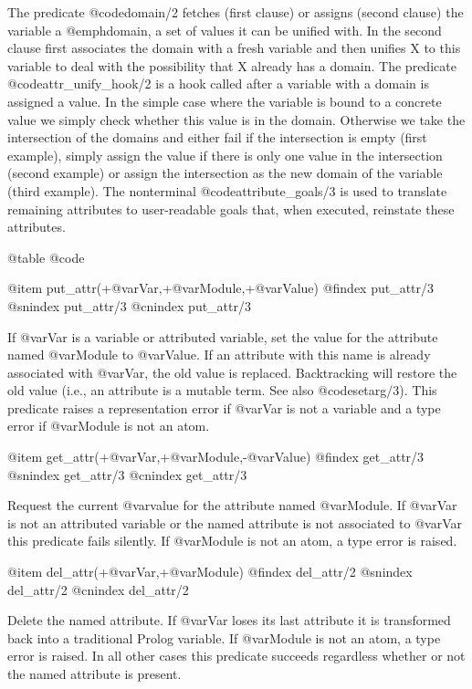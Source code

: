 The predicate @code{domain/2} fetches (first clause) or assigns
(second clause) the variable a @emph{domain}, a set of values it can
be unified with.  In the second clause first associates the domain
with a fresh variable and then unifies X to this variable to deal
with the possibility that X already has a domain. The
predicate @code{attr_unify_hook/2} is a hook called after a variable with
a domain is assigned a value.  In the simple case where the variable
is bound to a concrete value we simply check whether this value is in
the domain. Otherwise we take the intersection of the domains and either
fail if the intersection is empty (first example), simply assign the
value if there is only one value in the intersection (second example) or
assign the intersection as the new domain of the variable (third
example). The nonterminal @code{attribute_goals/3} is used to translate
remaining attributes to user-readable goals that, when executed, reinstate
these attributes.

@table @code

@item put_attr(+@var{Var},+@var{Module},+@var{Value})
@findex put_attr/3
@snindex put_attr/3
@cnindex put_attr/3

If @var{Var} is a variable or attributed variable, set the value for the
attribute named @var{Module} to @var{Value}. If an attribute with this
name is already associated with @var{Var}, the old value is replaced.
Backtracking will restore the old value (i.e., an attribute is a mutable
term. See also @code{setarg/3}). This predicate raises a representation error if
@var{Var} is not a variable and a type error if @var{Module} is not an atom.

@item get_attr(+@var{Var},+@var{Module},-@var{Value})
@findex get_attr/3
@snindex get_attr/3
@cnindex get_attr/3

Request the current @var{value} for the attribute named @var{Module}.  If
@var{Var} is not an attributed variable or the named attribute is not
associated to @var{Var} this predicate fails silently.  If @var{Module}
is not an atom, a type error is raised.

@item del_attr(+@var{Var},+@var{Module})
@findex del_attr/2
@snindex del_attr/2
@cnindex del_attr/2

Delete the named attribute.  If @var{Var} loses its last attribute it
is transformed back into a traditional Prolog variable.  If @var{Module}
is not an atom, a type error is raised. In all other cases this
predicate succeeds regardless whether or not the named attribute is
present.


